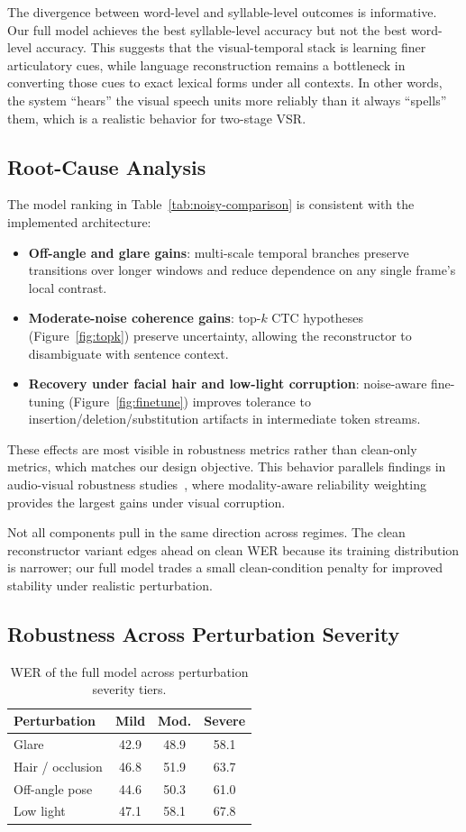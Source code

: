 \documentclass[10pt,twocolumn,letterpaper]{article}
\begin{document}
The divergence between word-level and syllable-level outcomes is informative. Our full model achieves the best syllable-level accuracy but not the best word-level accuracy. This suggests that the visual-temporal stack is learning finer articulatory cues, while language reconstruction remains a bottleneck in converting those cues to exact lexical forms under all contexts. In other words, the system ``hears'' the visual speech units more reliably than it always ``spells'' them, which is a realistic behavior for two-stage VSR.

\subsection{Root-Cause Analysis}
The model ranking in Table~\ref{tab:noisy-comparison} is consistent with the implemented architecture:
\begin{itemize}[leftmargin=*]
    \item \textbf{Off-angle and glare gains}: multi-scale temporal branches preserve transitions over longer windows and reduce dependence on any single frame's local contrast.
    \item \textbf{Moderate-noise coherence gains}: top-$k$ CTC hypotheses (Figure~\ref{fig:topk}) preserve uncertainty, allowing the reconstructor to disambiguate with sentence context.
    \item \textbf{Recovery under facial hair and low-light corruption}: noise-aware fine-tuning (Figure~\ref{fig:finetune}) improves tolerance to insertion/deletion/substitution artifacts in intermediate token streams.
\end{itemize}
These effects are most visible in robustness metrics rather than clean-only metrics, which matches our design objective. This behavior parallels findings in audio-visual robustness studies~\cite{hong2023watchorlisten}, where modality-aware reliability weighting provides the largest gains under visual corruption.

Not all components pull in the same direction across regimes. The clean reconstructor variant edges ahead on clean WER because its training distribution is narrower; our full model trades a small clean-condition penalty for improved stability under realistic perturbation.

\subsection{Robustness Across Perturbation Severity}
\begin{table}[t]
\centering
\small
\caption{WER of the full model across perturbation severity tiers.}
\label{tab:severity}
\begin{tabular}{lccc}
\toprule
Perturbation & Mild & Mod. & Severe \\
\midrule
Glare              & 42.9 & 48.9 & 58.1 \\
Hair / occlusion   & 46.8 & 51.9 & 63.7 \\
Off-angle pose     & 44.6 & 50.3 & 61.0 \\
Low light          & 47.1 & 58.1 & 67.8 \\
\bottomrule
\end{tabular}
\end{table}
\end{document}
